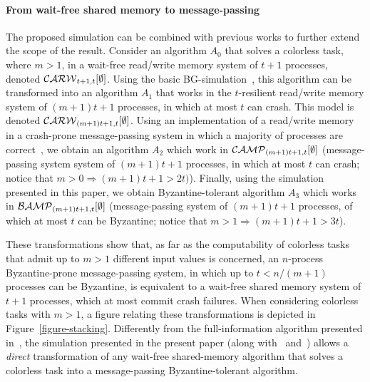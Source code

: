 \documentclass[11pt,letterpaper]{article}
\begin{document}
\paragraph{From wait-free shared memory to message-passing}
The proposed simulation can be combined with previous works
to further extend the  scope of the result. 
Consider an algorithm $A_0$ that solves a colorless task, where $m>1$,
in a wait-free read/write memory system of $t+1$ processes, denoted 
${\cal CARW}_{t+1,t}[\emptyset]$.
Using the basic BG-simulation~\cite{BG93}, 
this algorithm can be transformed into an algorithm $A_1$ 
that works in the $t$-resilient read/write memory system 
of $(m+1)t+1$ processes, in which at most $t$ can crash. 
This model is denoted ${\cal CARW}_{(m+1)t+1,t}[\emptyset]$.
Using an implementation
of a read/write memory in a crash-prone message-passing system in which a 
majority of processes are correct~\cite{ABD95}, we obtain an algorithm  
$A_2$  which work in ${\cal CAMP}_{(m+1)t+1,t}[\emptyset]$
(message-passing system 
system of $(m+1)t+1$ processes, in which at most $t$ can crash; 
notice that $m > 0 \Rightarrow (m+1)t+1>2t)$). 
Finally, using the simulation presented in this paper, we  obtain 
Byzantine-tolerant algorithm $A_3$ which works in 
${\cal BAMP}_{(m+1)t+1,t}[\emptyset]$  (message-passing  system of $(m+1)t+1$ 
processes, of which at most $t$ can be Byzantine; notice that
$m>1 \Rightarrow (m+1)t+1>3t$).

These transformations show that, as far as the computability of
colorless tasks that admit up to $m>1$ different input values is
concerned, an $n$-process Byzantine-prone message-passing system, in
which up to $t < n/(m+1)$ processes can be Byzantine, is equivalent to
a wait-free shared memory system of $t+1$ processes, which at most
commit crash failures.  When considering colorless tasks with $m>1$, a
figure relating these transformations is depicted in
Figure~\ref{figure-stacking}.  Differently from the 
full-information algorithm presented in~\cite{MTH14}, 
the simulation presented in the present paper
(along with~\cite{BG93} and~\cite{ABD95}) allows a {\it direct}
transformation of any wait-free shared-memory algorithm that solves a
colorless task into a message-passing Byzantine-tolerant algorithm.
\end{document}
